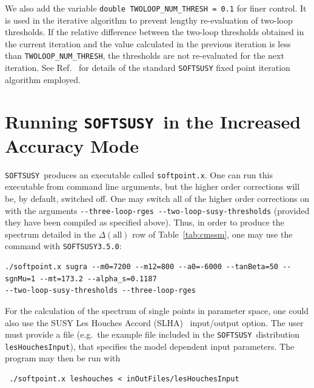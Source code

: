 \documentclass[final,3p,times,pdflatex]{elsarticle}
\def\SOFTSUSY{{\tt SOFTSUSY}}
\def\code#1{{\tt #1}}
\begin{document}
We also add the variable
\verb|double TWOLOOP_NUM_THRESH = 0.1| for finer control. It is 
          used in the iterative 
          algorithm to prevent lengthy re-evaluation of two-loop thresholds.
          If the relative difference between the two-loop thresholds obtained
          in the 
          current iteration and the value calculated in the previous
          iteration is less than
          \verb|TWOLOOP_NUM_THRESH|, the thresholds are not 
          re-evaluated for
          the next iteration.  
          See Ref.~\cite{Allanach:2001kg} for
          details of the standard {\tt SOFTSUSY} fixed point iteration 
          algorithm employed.
        
\section{Running \SOFTSUSY~in the Increased Accuracy Mode}  
\label{sec:run}

\SOFTSUSY~produces an executable called \code{softpoint.x}. 
One can run this executable from command line arguments, but the higher order
corrections will be, by default, switched off. One may switch all of the
higher order corrections on with 
the arguments 
\verb|--three-loop-rges --two-loop-susy-thresholds|
(provided they have
been compiled as specified above).
Thus, in order to produce the spectrum detailed in the $\Delta(\mbox{all})$
row of Table~\ref{tab:cmssm}, one may use the command with {\tt SOFTSUSY3.5.0}:
{\small\begin{verbatim}
./softpoint.x sugra --m0=7200 --m12=800 --a0=-6000 --tanBeta=50 --sgnMu=1 --mt=173.2 --alpha_s=0.1187 
--two-loop-susy-thresholds --three-loop-rges
\end{verbatim}\normalsize}
For the calculation
of the spectrum of single points in parameter space, one could also use the
SUSY Les Houches Accord (SLHA)~\cite{Skands:2003cj} input/output
option. The user must provide a file (e.g.\ the example file included
in the \SOFTSUSY~distribution
\code{lesHouchesInput}), that specifies the model dependent input
parameters. The program may then be run with
\small
\begin{verbatim}
 ./softpoint.x leshouches < inOutFiles/lesHouchesInput
\end{verbatim}
\normalsize
\end{document}
